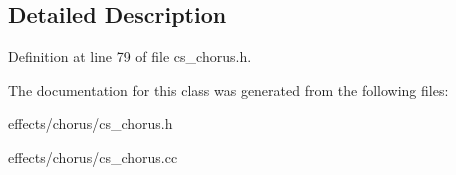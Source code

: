 \subsection{Detailed Description}


Definition at line 79 of file cs\+\_\+chorus.\+h.



The documentation for this class was generated from the following files\+:\begin{DoxyCompactItemize}
\item 
effects/chorus/cs\+\_\+chorus.\+h\item 
effects/chorus/cs\+\_\+chorus.\+cc\end{DoxyCompactItemize}
